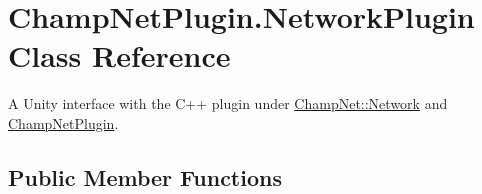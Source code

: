 \hypertarget{class_champ_net_plugin_1_1_network_plugin}{\section{Champ\-Net\-Plugin.\-Network\-Plugin Class Reference}
\label{class_champ_net_plugin_1_1_network_plugin}
}


A Unity interface with the C++ plugin under \hyperlink{class_champ_net_1_1_network}{Champ\-Net\-::\-Network} and \hyperlink{namespace_champ_net_plugin}{Champ\-Net\-Plugin}.  


\subsection*{Public Member Functions}
